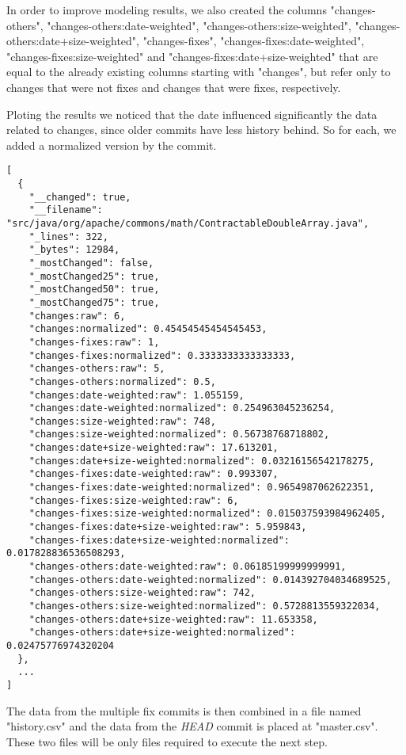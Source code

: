 In order to improve modeling results, we also created the columns "changes-others", "changes-others:date-weighted", "changes-others:size-weighted", "changes-others:date+size-weighted", 
"changes-fixes", "changes-fixes:date-weighted", "changes-fixes:size-weighted" and "changes-fixes:date+size-weighted" that are equal to the already existing columns starting with
"changes", but refer only to changes that were not fixes and changes that were fixes, respectively.

Ploting the results we noticed that the date influenced significantly the data related to changes, since older commits have less history behind. 
So for each, we added a normalized version by the commit.


\begin{lstlisting}
[
  {
    "__changed": true,
    "__filename": "src/java/org/apache/commons/math/ContractableDoubleArray.java",
    "_lines": 322,
    "_bytes": 12984,
    "_mostChanged": false,
    "_mostChanged25": true,
    "_mostChanged50": true,
    "_mostChanged75": true,
    "changes:raw": 6,
    "changes:normalized": 0.45454545454545453,
    "changes-fixes:raw": 1,
    "changes-fixes:normalized": 0.3333333333333333,
    "changes-others:raw": 5,
    "changes-others:normalized": 0.5,
    "changes:date-weighted:raw": 1.055159,
    "changes:date-weighted:normalized": 0.254963045236254,
    "changes:size-weighted:raw": 748,
    "changes:size-weighted:normalized": 0.56738768718802,
    "changes:date+size-weighted:raw": 17.613201,
    "changes:date+size-weighted:normalized": 0.03216156542178275,
    "changes-fixes:date-weighted:raw": 0.993307,
    "changes-fixes:date-weighted:normalized": 0.9654987062622351,
    "changes-fixes:size-weighted:raw": 6,
    "changes-fixes:size-weighted:normalized": 0.015037593984962405,
    "changes-fixes:date+size-weighted:raw": 5.959843,
    "changes-fixes:date+size-weighted:normalized": 0.017828836536508293,
    "changes-others:date-weighted:raw": 0.06185199999999991,
    "changes-others:date-weighted:normalized": 0.014392704034689525,
    "changes-others:size-weighted:raw": 742,
    "changes-others:size-weighted:normalized": 0.5728813559322034,
    "changes-others:date+size-weighted:raw": 11.653358,
    "changes-others:date+size-weighted:normalized": 0.02475776974320204
  },
  ...
]
\end{lstlisting}


The data from the multiple fix commits is then combined in a file named "history.csv" and the data from the \emph{HEAD} commit is placed at "master.csv". 
These two files will be only files required to execute the next step.


